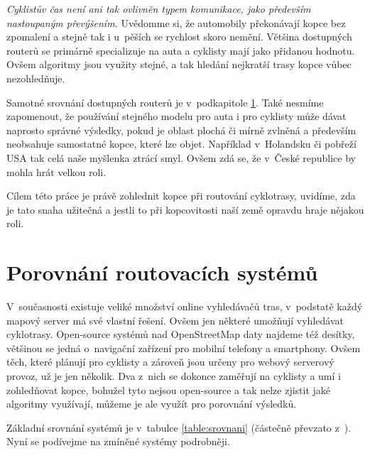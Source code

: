 \documentclass[thesis=B,czech]{FITthesis}[2012/06/26]
\begin{document}
\emph{Cyklistův čas není ani tak ovlivněn typem komunikace, jako především nastoupaným převýšením.} Uvědomme si, že automobily překonávají kopce bez zpomalení a stejně tak i u~pěších se rychlost skoro nemění. Většina dostupných routerů se primárně specializuje na auta a cyklisty mají jako přidanou hodnotu. Ovšem algoritmy jsou využity stejné, a tak hledání nejkratší trasy kopce vůbec nezohledňuje.

Samotné srovnání dostupných routerů je v~podkapitole \ref{porovnaniSystemu}. Také nesmíme zapomenout, že používání stejného modelu pro auta i pro cyklisty může dávat naprosto správné výsledky, pokud je oblast plochá či mírně zvlněná a především neobsahuje samostatné kopce, které lze objet. Například v~Holandsku či pobřeží USA tak celá naše myšlenka ztrácí smyl. Ovšem zdá se, že v~České republice by mohla hrát velkou roli.

Cílem této práce je právě zohlednit kopce při routování cyklotrasy, uvidíme, zda je tato snaha užitečná a jestli to při kopcovitosti naší země opravdu hraje nějakou roli.

\section{Porovnání routovacích systémů}
\label{porovnaniSystemu}
V~současnosti existuje veliké množství online vyhledávačů tras, v~podstatě každý mapový server má své vlastní řešení. Ovšem jen některé umožňují vyhledávat cyklotrasy. Open-source systémů nad OpenStreetMap daty najdeme též desítky, většinou se jedná o~navigační zařízení pro mobilní telefony a smartphony. Ovšem těch, které plánují pro cyklisty a zároveň jsou určeny pro webový serverový provoz, už je jen několik. Dva z~nich se dokonce zaměřují na cyklisty a umí i zohledňovat kopce, bohužel tyto nejsou open-source a tak nelze zjistit jaké algoritmy využívají, můžeme je ale využít pro porovnání výsledků.

Základní srovnání systémů je v~tabulce \ref{table:srovnani} (částečně převzato z~\cite{osmwiki-routers}). Nyní se podívejme na zmíněné systémy podrobněji.
\end{document}
